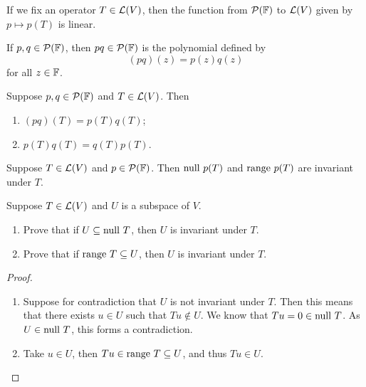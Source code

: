 \documentclass{extarticle}
\begin{document}
\begin{remark}
    If we fix an operator \(T \in \mathcal{L}(V)\), then the function from \(\mathcal{P}(\mathbb{F})\) to \(\mathcal{L}(V)\)
    given by \(p \mapsto p(T)\) is linear. 
\end{remark}

\begin{definition}
    If \(p, q \in \mathcal{P}(\mathbb{F})\), then \(pq \in \mathcal{P}(\mathbb{F})\) is the polynomial defined by 
    \[(pq)(z) = p(z)q(z)\]
    for all \(z \in \mathbb{F}\).
\end{definition}

\begin{thm}
    Suppose \(p, q \in \mathcal{P}(\mathbb{F})\) and \(T \in \mathcal{L}(V)\). Then 
    \begin{enumerate}[label=(\alph*)]
        \item \((pq)(T) = p(T) q(T)\);
        \item \(p(T)q(T) = q(T)p(T)\).
    \end{enumerate}
\end{thm}

\begin{definition}
    Suppose \(T \in \mathcal{L}(V)\) and \(p \in \mathcal{P}(\mathbb{F})\). Then \(\text{null } p(T)\) and \(\text{range } p(T)\)
    are invariant under \(T\).
\end{definition}


\newpage 
{}

\begin{problem}{1}
    Suppose \(T \in \mathcal{L}(V)\) and \(U\) is a subspace of \(V\). 
    \begin{enumerate}[label=(\alph*)]
        \item Prove that if \(U \subseteq \text{null } T\), then \(U\) is invariant under \(T\). 
        \item Prove that if \(\text{range } T \subseteq U\), then \(U\) is invariant under \(T\).
    \end{enumerate}
\end{problem}

\begin{proof}
\begin{enumerate}[label=(\alph*)]
    \item  Suppose for contradiction that \(U\) is not invariant under \(T\). Then this means 
    that there exists \(u \in U\) such that \(T u \notin U\). We know that \(Tu = 0 \in \text{null } T\). 
    As \(U \in \text{null } T\), this forms a contradiction. 
    
    \item Take \(u \in U\), then \(Tu \in \text{range } T \subseteq U\), and thus \(Tu \in U\).
\end{enumerate}
\end{proof}
\end{document}

